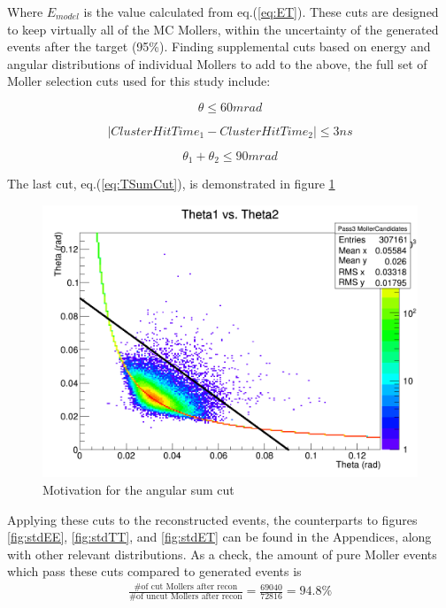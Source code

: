 \documentclass{article}
\begin{document}
	Where $E_{model}$ is the value calculated from eq.(\ref{eq:ET}). These cuts are designed to keep virtually all of the MC Mollers, within the uncertainty of the generated events after the target (95\%). Finding supplemental cuts based on energy and angular distributions of individual Mollers to add to the above, the full set of Moller selection cuts used for this study include:
	
	\begin{equation} \label{eq:TCut}
  	\theta\leq 60 mrad
	\end{equation}
	
	\begin{equation} \label{eq:CoinCut}
  	|Cluster Hit Time_{1} - Cluster Hit Time_{2}| \leq 3 ns
	\end{equation}
	
	\begin{equation} \label{eq:TSumCut}
  	\theta_1+ \theta_2\leq 90 mrad
	\end{equation}\newline
	
	The last cut, eq.(\ref{eq:TSumCut}), is demonstrated in figure \ref{fig:TSumCut}
	
	\begin{figure}[H]
  	\includegraphics[width=\linewidth]{best_so_far/RAW_mollerTT}
  	\caption{Motivation for the angular sum cut}
  	\label{fig:TSumCut}
	\end{figure}
	
	Applying these cuts to the reconstructed events, the counterparts to figures \ref{fig:stdEE}, \ref{fig:stdTT}, and \ref{fig:stdET} can be found in the Appendices, along with other relevant distributions.
	As a check, the amount of pure Moller events which pass these cuts compared to generated events is
	\begin{equation} \label{eq:efficiency}
	\begin{split}
  	\frac{\mbox{\# of cut Mollers after recon}}{\mbox{\# of uncut Mollers after recon}}
  	= \frac{\mbox{69040}}{\mbox{72816}} = \mbox{94.8\%}
  	\end{split}
	\end{equation}
\end{document}
